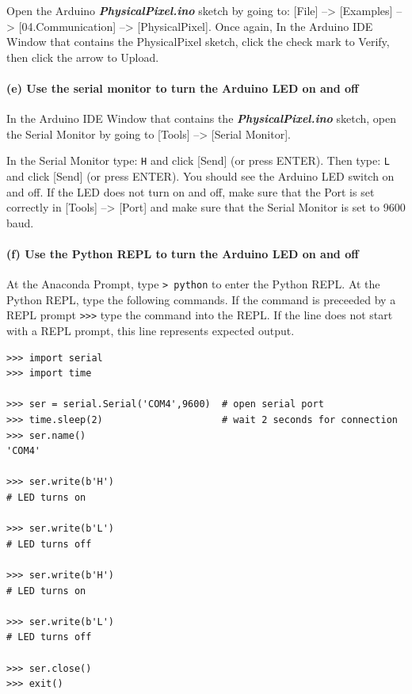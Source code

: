 \documentclass[11pt]{article}
\begin{document}
Open the Arduino \textbf{\emph{PhysicalPixel.ino}} sketch by going to:
{[}File{]} --\textgreater{} {[}Examples{]} --\textgreater{}
{[}04.Communication{]} --\textgreater{} {[}PhysicalPixel{]}. Once again,
In the Arduino IDE Window that contains the PhysicalPixel sketch, click
the check mark to Verify, then click the arrow to Upload.

    \hypertarget{e-use-the-serial-monitor-to-turn-the-arduino-led-on-and-off}{%
\paragraph{(e) Use the serial monitor to turn the Arduino LED on and
off}\label{e-use-the-serial-monitor-to-turn-the-arduino-led-on-and-off}}

In the Arduino IDE Window that contains the
\textbf{\emph{PhysicalPixel.ino}} sketch, open the Serial Monitor by
going to {[}Tools{]} --\textgreater{} {[}Serial Monitor{]}.

In the Serial Monitor type: \texttt{H} and click {[}Send{]} (or press
ENTER). Then type: \texttt{L} and click {[}Send{]} (or press ENTER). You
should see the Arduino LED switch on and off. If the LED does not turn
on and off, make sure that the Port is set correctly in {[}Tools{]}
--\textgreater{} {[}Port{]} and make sure that the Serial Monitor is set
to 9600 baud.

    \hypertarget{f-use-the-python-repl-to-turn-the-arduino-led-on-and-off}{%
\paragraph{(f) Use the Python REPL to turn the Arduino LED on and
off}\label{f-use-the-python-repl-to-turn-the-arduino-led-on-and-off}}

At the Anaconda Prompt, type \texttt{\textgreater{}\ python} to enter
the Python REPL. At the Python REPL, type the following commands. If the
command is preceeded by a REPL prompt
\texttt{\textgreater{}\textgreater{}\textgreater{}} type the command
into the REPL. If the line does not start with a REPL prompt, this line
represents expected output.

\begin{verbatim}
>>> import serial
>>> import time

>>> ser = serial.Serial('COM4',9600)  # open serial port
>>> time.sleep(2)                     # wait 2 seconds for connection
>>> ser.name()
'COM4'

>>> ser.write(b'H')
# LED turns on

>>> ser.write(b'L')
# LED turns off

>>> ser.write(b'H')
# LED turns on

>>> ser.write(b'L')
# LED turns off

>>> ser.close()
>>> exit()
\end{verbatim}
\end{document}

